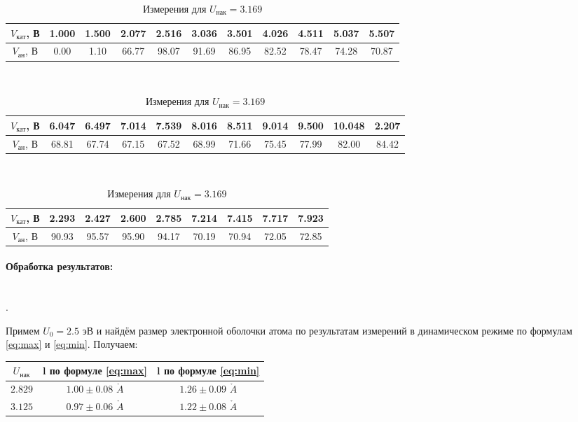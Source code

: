 \documentclass[a4paper, 12pt]{article}
\renewcommand{\AA}{\ensuremath{\mathring{A}}}
\newcommand{\parag}[1]{\paragraph*{#1:}}
\newcounter{Points}
\newcommand{\point}{\arabic{Points}. \addtocounter{Points}{1}}
\begin{document}
\begin{table}[!h]
    \centering
    \begin{tabular}{|c|c|c|c|c|c|c|c|c|c|c|}
        \hline
        $V_{кат}$, В & 1.000 & 1.500 & 2.077 & 2.516 & 3.036 & 3.501 & 4.026 & 4.511 & 5.037 & 5.507 \\ \hline
        $V_{ан}$, В & 0.00 & 1.10 & 66.77 & 98.07 & 91.69 & 86.95 & 82.52 & 78.47 & 74.28 & 70.87 \\ \hline
    \end{tabular}
    ~\\
    \begin{tabular}{|c|c|c|c|c|c|c|c|c|c|c|}
        \hline
        $V_{кат}$, В & 6.047 & 6.497 & 7.014 & 7.539 & 8.016 & 8.511 & 9.014 & 9.500 & 10.048 & 2.207 \\ \hline
        $V_{ан}$, В & 68.81 & 67.74 & 67.15 & 67.52 & 68.99 & 71.66 & 75.45 & 77.99 & 82.00 & 84.42 \\ \hline
    \end{tabular}
    ~\\
    \begin{tabular}{|c|c|c|c|c|c|c|c|c|}
        \hline
        $V_{кат}$, В & 2.293 & 2.427 & 2.600 & 2.785 & 7.214 & 7.415 & 7.717 & 7.923 \\ \hline
        $V_{ан}$, В & 90.93 & 95.57 & 95.90 & 94.17 & 70.19 & 70.94 & 72.05 & 72.85 \\ \hline
    \end{tabular}
    \caption {Измерения для $U_{нак} = 3.169$}
    \label{tab:stat2}
\end{table}

\newpage

\parag {Обработка результатов} ~\\

\point Примем $U_0 = 2.5$ эВ и найдём размер электронной оболочки атома по результатам измерений в динамическом режиме по формулам \eqref{eq:max} и \eqref{eq:min}. Получаем:

\begin{table}[!h]
    \centering
    \begin{tabular}{|c|c|c|}
        \hline
        $U_{нак}$ & l по формуле \eqref{eq:max} & l по формуле \eqref{eq:min} \\ \hline
        $2.829$ & $1.00 \pm 0.08$ \AA & $1.26 \pm 0.09$ \AA \\ \hline
        $3.125$ & $0.97 \pm 0.06$ \AA & $1.22 \pm 0.08$ \AA \\ \hline
    \end{tabular}
\end{table}
\end{document}
